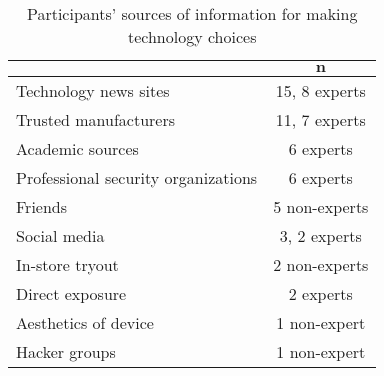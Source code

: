 

\begin{table}[htbp]
\scriptsize
    \centering
    \setlength{\extrarowsep}{6pt}

    \begin{tabular}{>{\raggedleft\arraybackslash}p{1in} | c}
    {\bf Source} & $\boldsymbol{n}$ \\
        \hline 
Technology news sites & 15, 8 experts \\ \hline %
Trusted manufacturers & 11, 7 experts \\ \hline%
Academic sources & 6 experts \\ \hline
Professional security organizations & 6 experts \\ \hline
Friends & 5 non-experts \\ \hline
Social media & 3, 2 experts \\ \hline
In-store tryout & 2 non-experts \\ \hline
Direct exposure & 2 experts \\ \hline
Aesthetics of device & 1 non-expert \\ \hline
Hacker groups & 1 non-expert \\ \hline
    \end{tabular}
    \caption{Participants' sources of information for making technology choices}
\label{tab:info_sources}
\end{table}



